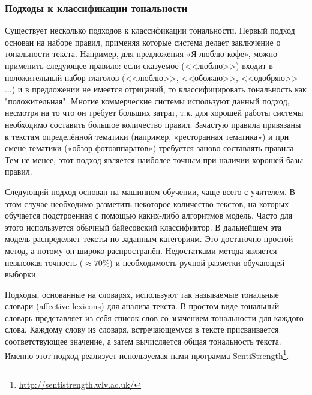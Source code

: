 \subsubsection{Подходы к классификации тональности}
Существует несколько подходов к классификации тональности. Первый подход основан на наборе правил, применяя которые система делает заключение о тональности текста. Например, для предложения «Я люблю кофе», можно применить следующее правило: если сказуемое (<<люблю>>) входит в положительный набор глаголов (<<люблю>>, <<обожаю>>, <<одобряю>> ...) и в предложении не имеется отрицаний, то классифицировать тональность как "положительная". Многие коммерческие системы используют данный подход, несмотря на то что он требует больших затрат, т.к. для хорошей работы системы необходимо составить большое количество правил. Зачастую правила привязаны к текстам определённой тематики (например, «ресторанная тематика») и при смене тематики («обзор фотоаппаратов») требуется заново составлять правила. Тем не менее, этот подход является наиболее точным при наличии хорошей базы правил.

Следующий подход основан на машинном обучении, чаще всего с учителем. В этом случае необходимо разметить некоторое количество текстов, на которых обучается подстроенная с помощью каких-либо алгоритмов модель. Часто для этого используется обычный байесовский классификтор. В дальнейшем эта модель распределяет тексты по заданным категориям. Это достаточно простой метод, а потому он широко распространён. Недостатками метода является невысокая точность ($\approx70$\%) и необходимость ручной разметки обучающей выборки.

Подходы, основанные на словарях, используют так называемые тональные словари (affective lexicons) для анализа текста. В простом виде тональный словарь представляет из себя список слов со значением тональности для каждого слова. Каждому слову из словаря, встречающемуся в тексте присваивается соответствующее значение, а затем вычисляется общая тональность текста. Именно этот подход реализует используемая нами программа SentiStrength\footnote{\href{http://sentistrength.wlv.ac.uk/}{http://sentistrength.wlv.ac.uk/}}.

